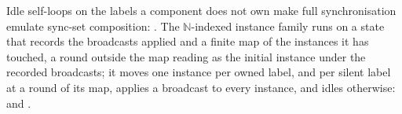 \begin{definition}
  \label{def:idle-family}
  \leanok
  Idle self-loops on the labels a component does not own make full synchronisation emulate sync-set composition: .
  The $\mathbb{N}$-indexed instance family runs on a state that records the broadcasts applied and a finite map of the instances it has touched, a round outside the map reading as the initial instance under the recorded broadcasts; it moves one instance per owned label, and per silent label at a round of its map, applies a broadcast to every instance, and idles otherwise:  and .
\end{definition}
